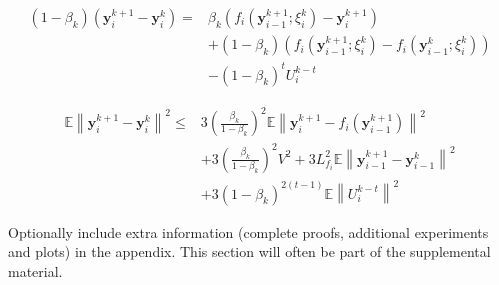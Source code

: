 \begin{equation*}
\begin{split}
\left ( 1-\beta_k \right )\left ( \boldsymbol{y}_i^{k+1}-\boldsymbol{y}_i^k \right )=&\beta_k\left ( f_i\left ( \boldsymbol{y}_{i-1}^{k+1};\xi_i^k \right )-\boldsymbol{y}_i^{k+1} \right )\\
&+\left ( 1-\beta_k \right )\left ( f_i\left ( \boldsymbol{y}_{i-1}^{k+1};\xi_i^k \right )-f_i\left ( \boldsymbol{y}_{i-1}^k;\xi_i^k \right ) \right )\\
&-\left ( 1-\beta_k \right )^tU_i^{k-t}
\end{split}
\end{equation*}

\begin{equation*}
\begin{split}
\mathbb{E}\left \| \boldsymbol{y}_i^{k+1}-\boldsymbol{y}_i^k \right \|^2\leq&3\left ( \frac{\beta_k}{1-\beta_k} \right )^2\mathbb{E}\left \| \boldsymbol{y}_i^{k+1}-f_i\left ( \boldsymbol{y}_{i-1}^{k+1} \right ) \right \|^2\\
&+3\left ( \frac{\beta_k}{1-\beta_k} \right )^2V^2+3L_{f_i}^2\mathbb{E}\left \| \boldsymbol{y}_{i-1}^{k+1}-\boldsymbol{y}_{i-1}^k \right \|^2\\
&+3\left ( 1-\beta_k \right )^{2(t-1)}\mathbb{E}\left \| U_i^{k-t} \right \|^2
\end{split}
\end{equation*}

Optionally include extra information (complete proofs, additional experiments and plots) in the appendix.
This section will often be part of the supplemental material.
